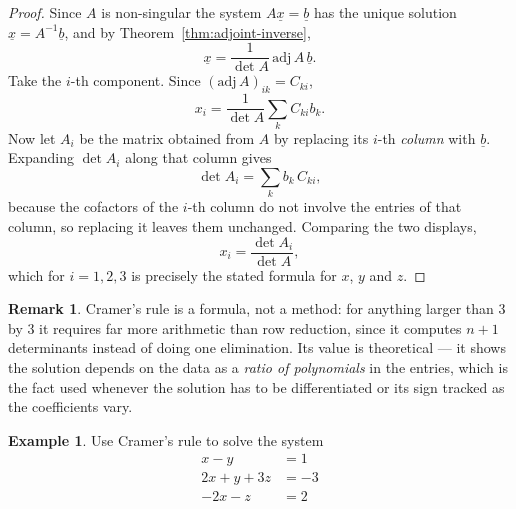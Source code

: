 \documentclass[11pt,a4paper]{article}
\theoremstyle{definition}
\newtheorem{exa}[thm]{Example}
\newtheorem*{remark}{Remark}
\begin{document}
\begin{proof}
Since $A$ is non-singular the system $A\underline{x}=\underline{b}$ has the
unique solution $\underline{x}=A^{-1}\underline{b}$, and by
Theorem~\ref{thm:adjoint-inverse},
$$\underline{x}=\frac{1}{\det A}\,\text{adj}\,A\,\underline{b}.$$
Take the $i$-th component. Since $(\text{adj}\,A)_{ik}=C_{ki}$,
$$x_i=\frac{1}{\det A}\sum_{k}C_{ki}b_k.$$
Now let $A_i$ be the matrix obtained from $A$ by replacing its $i$-th
\emph{column} with $\underline{b}$. Expanding $\det A_i$ along that column
gives
$$\det A_i=\sum_{k}b_k\,C_{ki},$$
because the cofactors of the $i$-th column do not involve the entries of that
column, so replacing it leaves them unchanged. Comparing the two displays,
$$x_i=\frac{\det A_i}{\det A},$$
which for $i=1,2,3$ is precisely the stated formula for $x$, $y$ and $z$.
\end{proof}

\begin{remark}
Cramer's rule is a formula, not a method: for anything larger than $3$ by $3$
it requires far more arithmetic than row reduction, since it computes $n+1$
determinants instead of doing one elimination. Its value is theoretical --- it
shows the solution depends on the data as a \emph{ratio of polynomials} in the
entries, which is the fact used whenever the solution has to be differentiated
or its sign tracked as the coefficients vary.
\end{remark}

\begin{exa}
Use Cramer's rule to solve the system
\begin{align*}
x-y&=1\\2x+y+3z&=-3\\-2x-z&=2
\end{align*}
\end{exa}
\end{document}

